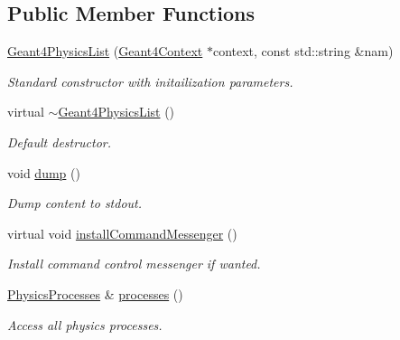 \subsection*{Public Member Functions}
\begin{DoxyCompactItemize}
\item 
\hyperlink{class_d_d4hep_1_1_simulation_1_1_geant4_physics_list_aeadd72c30287f2dfc804c893f976ac9d}{Geant4PhysicsList} (\hyperlink{class_d_d4hep_1_1_simulation_1_1_geant4_context}{Geant4Context} $\ast$context, const std::string \&nam)
\begin{DoxyCompactList}\small\item\em Standard constructor with initailization parameters. \item\end{DoxyCompactList}\item 
virtual \hyperlink{class_d_d4hep_1_1_simulation_1_1_geant4_physics_list_a224e107987da2017407996766e9bd445}{$\sim$Geant4PhysicsList} ()
\begin{DoxyCompactList}\small\item\em Default destructor. \item\end{DoxyCompactList}\item 
void \hyperlink{class_d_d4hep_1_1_simulation_1_1_geant4_physics_list_a938fd59bb0072ba9c304828aeb6e267b}{dump} ()
\begin{DoxyCompactList}\small\item\em Dump content to stdout. \item\end{DoxyCompactList}\item 
virtual void \hyperlink{class_d_d4hep_1_1_simulation_1_1_geant4_physics_list_af18b7d6454f56d0aa6e55a2046cff019}{installCommandMessenger} ()
\begin{DoxyCompactList}\small\item\em Install command control messenger if wanted. \item\end{DoxyCompactList}\item 
\hyperlink{class_d_d4hep_1_1_simulation_1_1_geant4_physics_list_ab41e55687c9d57878fe2e6847a31f19a}{PhysicsProcesses} \& \hyperlink{class_d_d4hep_1_1_simulation_1_1_geant4_physics_list_abd2fd72a935c5a809d216026b503e154}{processes} ()
\begin{DoxyCompactList}\small\item\em Access all physics processes. \item\end{DoxyCompactList}\item 

\end{DoxyCompactItemize}
